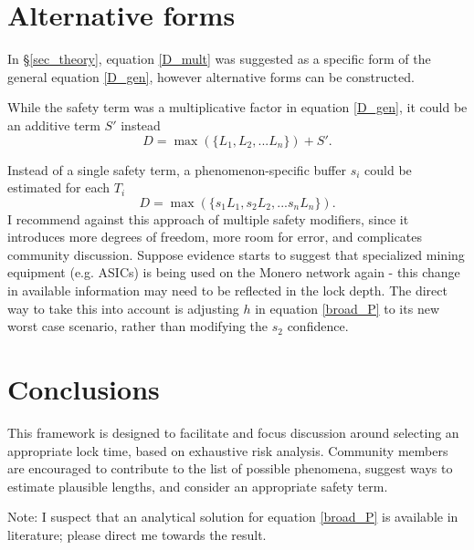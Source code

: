 \documentclass{mrl}
\begin{document}
\section{Alternative forms}
In \S\ref{sec_theory}, equation \ref{D_mult} was suggested as a specific form of the general equation \ref{D_gen}, however alternative forms can be constructed.

While the safety term was a multiplicative factor in equation \ref{D_gen}, it could be an additive term $S'$ instead
\begin{equation}D = \max(\{L_1, L_2, ... L_n\}) + S'. \label{D_add} \end{equation}

Instead of a single safety term, a phenomenon-specific buffer $s_i$ could be estimated for each $T_i$
\begin{equation}D = \max(\{s_1L_1, s_2L_2, ... s_nL_n\}). \label{D_breakout} \end{equation}
I recommend against this approach of multiple safety modifiers, since it introduces more degrees of freedom, more room for error, and complicates community discussion. Suppose evidence starts to suggest that specialized mining equipment (e.g. ASICs) is being used on the Monero network again - this change in available information may need to be reflected in the lock depth. The direct way to take this into account is adjusting $h$ in equation \ref{broad_P} to its new worst case scenario, rather than modifying the $s_2$ confidence.

\section{Conclusions}
This framework is designed to facilitate and focus discussion around selecting an appropriate lock time, based on exhaustive risk analysis. Community members are encouraged to contribute to the list of possible phenomena, suggest ways to estimate plausible lengths, and consider an appropriate safety term.

Note: I suspect that an analytical solution for equation \ref{broad_P} is available in literature; please direct me towards the result.
\end{document}
